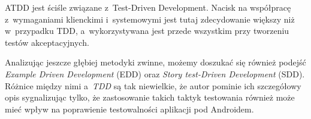 ATDD jest ściśle związane z~Test-Driven Development. Nacisk na współpracę z~wymaganiami klienckimi i~systemowymi jest tutaj zdecydowanie większy niż w~przypadku TDD, a~wykorzystywana jest przede wszystkim przy tworzeniu testów akceptacyjnych.

Analizując jeszcze głębiej metodyki zwinne, możemy doszukać się również podejść \textit{Example Driven Development} (EDD) oraz \textit{Story test-Driven Development} (SDD). Różnice między nimi a~\textit{TDD} są tak niewielkie, że autor pominie ich szczegółowy opis sygnalizując tylko, że zastosowanie takich taktyk testowania również może mieć wpływ na poprawienie testowalności aplikacji pod Androidem.  






